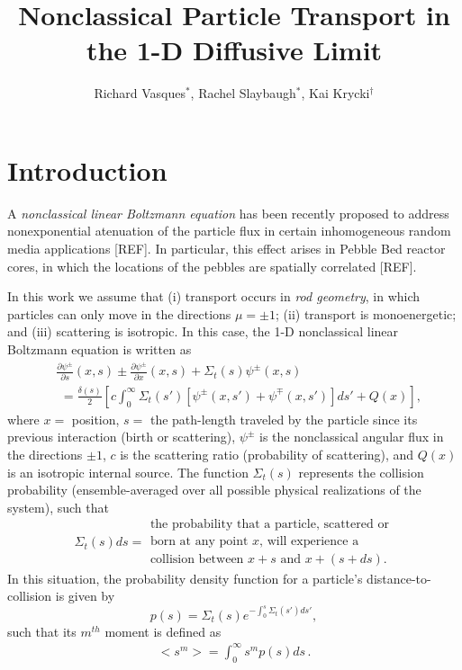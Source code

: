 \documentclass{anstrans}
\title{Nonclassical Particle Transport in the 1-D Diffusive Limit}
\author{Richard Vasques$^{*}$, Rachel Slaybaugh$^{*}$, Kai Krycki$^{\dagger}$}
\institute{
$^{*}$Dept. of Nuclear Engineering, University of California, Berkeley, 4103 Etcheverry Hall, MC 1730,
Berkeley, CA 94720-1730
\and
$^{\dagger}$ TBD, Germany
}
\newcommand{\bl}{\big<}
\newcommand{\bg}{\big>}
\begin{document}
\section{Introduction}
A \textit{nonclassical linear Boltzmann equation} has been recently proposed  to address nonexponential atenuation of the particle flux  in certain inhomogeneous random media applications [REF]. In particular, this effect arises in Pebble Bed reactor cores,  in which the locations of the pebbles are spatially correlated [REF]. 

In this work we assume that (i) transport occurs in \textit{rod geometry}, in which particles can only move in the directions $\mu=\pm 1$; (ii) transport is monoenergetic; and (iii) scattering is isotropic. In this case, the 1-D nonclassical linear Boltzmann equation is written as
\begin{align}
\label{eq1}
&\frac{\partial\psi^\pm}{\partial s}(x,s) \pm\frac{\partial\psi^\pm}{\partial x} (x,s) + \Sigma_t(s)\psi^\pm(x,s)\\
&\,\,= \frac{\delta(s)}{2}\left[ c\int_0^\infty \Sigma_t(s')\left[\psi^\pm(x,s') + \psi^\mp(x,s')\right]ds'+ Q(x) \right], \nonumber
\end{align}
where $x =$ position, $s =$ the path-length traveled by the particle since its previous
interaction (birth or scattering), $\psi^\pm$ is the nonclassical angular flux in the directions $\pm 1$, $c$ is the scattering ratio (probability of scattering), and $Q(x)$ is an isotropic internal source. The function $\Sigma_t(s)$ represents the collision probability (ensemble-averaged over all possible physical realizations of the system), such that
\begin{equation}
\Sigma_t(s)ds = \begin{array}{l}
\text{the probability that a particle, scattered or}\\
\text{born at any point $x$, will experience a}\\
\text{collision between $x + s$ and $x + (s+ds)$.}
\end{array} \nonumber
 \end{equation}
In this situation, the probability density function for a particle's distance-to-collision is given by
\begin{equation}\label{eq2}
p(s) = \Sigma_t(s)e^{-\int_0^s \Sigma_t(s')ds'},
\end{equation}
such that its $m^{th}$ moment is defined as
\begin{align}\label{eq4}
\bl s^m \bg = \int_0^{\infty}s^mp(s)ds\,.
\end{align}
\end{document}
